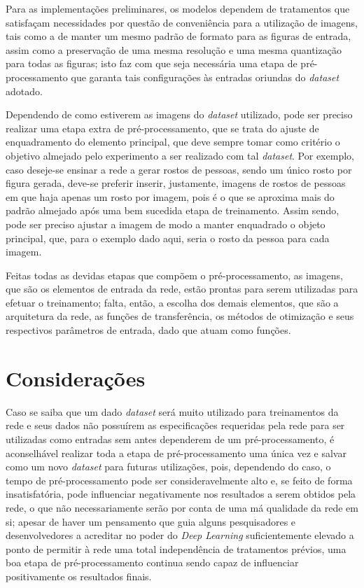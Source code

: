 Para as implementações preliminares, os modelos dependem de tratamentos que satisfaçam necessidades por questão de conveniência para a utilização de imagens, tais como a de manter um mesmo padrão de formato para as figuras de entrada, assim como a preservação de uma mesma resolução e uma mesma quantização para todas as figuras; isto faz com que seja necessária uma etapa de pré-processamento que garanta tais configurações às entradas oriundas do \textit{dataset} adotado.

Dependendo de como estiverem as imagens do \textit{dataset} utilizado, pode ser preciso realizar uma etapa extra de pré-processamento, que se trata do ajuste de enquadramento do elemento principal, que deve sempre tomar como critério o objetivo almejado pelo experimento a ser realizado com tal \textit{dataset}. Por exemplo, caso deseje-se ensinar a rede a gerar rostos de pessoas, sendo um único rosto por figura gerada, deve-se preferir inserir, justamente, imagens de rostos de pessoas em que haja apenas um rosto por imagem, pois é o que se aproxima mais do padrão almejado após uma bem sucedida etapa de treinamento. Assim sendo, pode ser preciso ajustar a imagem de modo a manter enquadrado o objeto principal, que, para o exemplo dado aqui, seria o rosto da pessoa para cada imagem.

Feitas todas as devidas etapas que compõem o pré-processamento, as imagens, que são os elementos de entrada da rede, estão prontas para serem utilizadas para efetuar o treinamento; falta, então, a escolha dos demais elementos, que são a arquitetura da rede, as funções de transferência, os métodos de otimização e seus respectivos parâmetros de entrada, dado que atuam como funções.







\section{Considerações}
\label{sec:gan_for_bss_considerations}

Caso se saiba que um dado \textit{dataset} será muito utilizado para treinamentos da rede e seus dados não possuírem as especificações requeridas pela rede para ser utilizadas como entradas sem antes dependerem de um pré-processamento, é aconselhável realizar toda a etapa de pré-processamento uma única vez e salvar como um novo \textit{dataset} para futuras utilizações, pois, dependendo do caso, o tempo de pré-processamento pode ser consideravelmente alto e, se feito de forma insatisfatória, pode influenciar negativamente nos resultados a serem obtidos pela rede, o que não necessariamente serão por conta de uma má qualidade da rede em si; apesar de haver um pensamento que guia alguns pesquisadores e desenvolvedores a acreditar no poder do \textit{Deep Learning} suficientemente elevado a ponto de permitir à rede uma total independência de tratamentos prévios, uma boa etapa de pré-processamento continua sendo capaz de influenciar positivamente os resultados finais.



